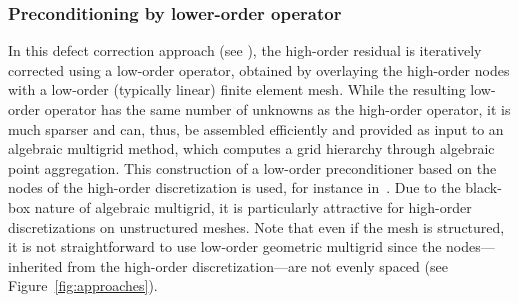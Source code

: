 \documentclass[smallcondensed,final]{svjour3}     %
\newcommand{\gsnote}[1]{\textcolor{blue}{GS: #1}}
\begin{document}
\subsubsection{Preconditioning by lower-order operator} \label{subsec:low}
In this defect correction approach (see
\cite{TrottenbergOosterleeSchuller01, Hackbusch85}), the high-order
residual is iteratively corrected using a low-order operator,
obtained by overlaying the high-order nodes with a low-order
(typically linear) finite element mesh. While the resulting low-order
operator has the same number of unknowns as the high-order operator,
it is much sparser and can, thus, be assembled efficiently and
provided as input to an algebraic multigrid method, which computes a
grid hierarchy through algebraic point aggregation.  This construction
of a low-order preconditioner based on the nodes of the high-order
discretization is used, for instance in~\cite{Brown10, Kim07,
  DevilleMund90, HeysManteuffelMcCormickEtAl05}. Due to the black-box
nature of algebraic multigrid, it is particularly attractive for
high-order discretizations on unstructured meshes. Note that even if
the mesh is structured, it is not
straightforward to use low-order geometric multigrid since the nodes---inherited from the high-order discretization---are not evenly spaced
(see Figure~\ref{fig:approaches}).








\end{document}
